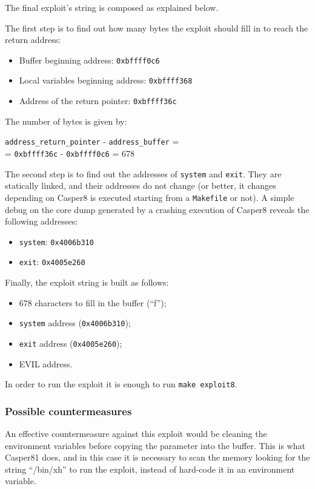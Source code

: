 The final exploit's string is composed as explained below.

The first step is to find out how many bytes the exploit should fill in to reach the return address:
\begin{itemize}
	\item Buffer beginning address: \texttt{0xbffff0c6}
	\item Local variables beginning address: \texttt{0xbffff368}
	\item Address of the return pointer: \texttt{0xbffff36c}
\end{itemize}
The number of bytes is given by:
\begin{center}
	\texttt{address\_return\_pointer} - \texttt{address\_buffer} =\\
	= \texttt{0xbffff36c} - \texttt{0xbffff0c6} = 678
\end{center}

The second step is to find out the addresses of \texttt{system} and \texttt{exit}. They are statically linked, and their addresses do not change (or better, it changes depending on Casper8 is executed starting from a \texttt{Makefile} or not). A simple debug on the core dump generated by a crashing execution of Casper8 reveals the following addresses:
\begin{itemize}
	\item \texttt{system}: \texttt{0x4006b310}
	\item \texttt{exit}: \texttt{0x4005e260}
\end{itemize}

Finally, the exploit string is built as follows:
\begin{itemize}
	\item 678 characters to fill in the buffer (``f'');
	\item \texttt{system} address (\texttt{0x4006b310});
	\item \texttt{exit} address (\texttt{0x4005e260});
	\item EVIL address.
\end{itemize}

In order to run the exploit it is enough to run \texttt{make exploit8}.

\subsubsection{Possible countermeasures}
An effective countermeasure against this exploit would be cleaning the environment variables before copying the parameter into the buffer. This is what Casper81 does, and in this case it is necessary to scan the memory looking for the string ``/bin/xh'' to run the exploit, instead of hard-code it in an environment variable.

